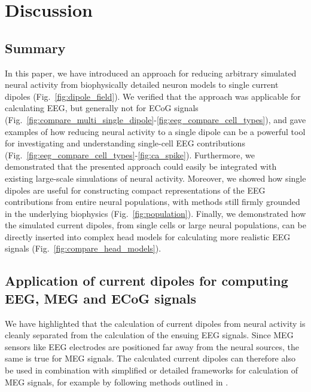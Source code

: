 \documentclass[preprint,10pt,authoryear]{elsarticle}
\begin{document}
\section{Discussion}\label{sec:discussion}


\subsection{Summary}

In this paper, we have introduced an approach for reducing arbitrary simulated neural activity from biophysically detailed neuron models to single current dipoles (Fig.~\ref{fig:dipole_field}).  
We verified that the approach was applicable for calculating EEG, but generally not for ECoG signals (Fig.~\ref{fig:compare_multi_single_dipole}-\ref{fig:eeg_compare_cell_types}), and gave examples of how reducing neural activity to a single dipole can be a powerful tool for investigating and understanding single-cell EEG contributions (Fig.~\ref{fig:eeg_compare_cell_types}-\ref{fig:ca_spike}). Furthermore, we demonstrated that the presented approach could easily be integrated with existing large-scale simulations of neural activity. Moreover, we showed how single dipoles are useful for constructing compact representations of the EEG contributions from entire neural populations, with methods still firmly grounded in the underlying biophysics (Fig.~\ref{fig:population}). Finally, we demonstrated how the simulated current dipoles, from single cells or large neural populations, can be directly inserted into complex head models for calculating more realistic EEG signals (Fig.~\ref{fig:compare_head_models}).

\subsection{Application of current dipoles for computing EEG, MEG and ECoG signals}
We have highlighted that the calculation of current dipoles from neural activity is cleanly separated from the calculation of the ensuing EEG signals. 
Since MEG sensors like EEG electrodes are positioned far away from the neural sources, the same is true for MEG signals. The calculated current dipoles can therefore also be used in combination with simplified or detailed frameworks for calculation of MEG signals, for example by following methods outlined in \cite{HAGEN2018, Ilmoniemi2019}.
\end{document}
